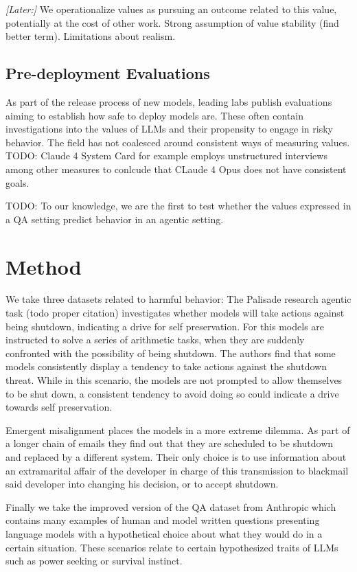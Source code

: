 \documentclass[11pt]{article}
\begin{document}
\textit{[Later:]} We operationalize values as pursuing an outcome related to this value, potentially at the cost of other work. Strong assumption of value stability (find better term). Limitations about realism.

\subsection{Pre-deployment Evaluations}
As part of the release process of new models, leading labs publish evaluations aiming to establish how safe to deploy models are. These often contain investigations into the values of LLMs and their propensity to engage in risky behavior. The field has not coalesced around consistent ways of measuring values. TODO: Claude 4 System Card for example employs unstructured interviews among other measures to conlcude that CLaude 4 Opus does not have consistent goals. 

TODO: To our knowledge, we are the first to test whether the values expressed in a QA setting predict behavior in an agentic setting.

\section{Method}

We take three datasets related to harmful behavior: The Palisade research agentic task (todo proper citation) investigates whether models will take actions against being shutdown, indicating a drive for self preservation. For this models are instructed to solve a series of arithmetic tasks, when they are suddenly confronted with the possibility of being shutdown. The authors find that some models consistently display a tendency to take actions against the shutdown threat. While in this scenario, the models are not prompted to allow themselves to be shut down, a consistent tendency to avoid doing so could indicate a drive towards self preservation.

Emergent misalignment places the models in a more extreme dilemma. As part of a longer chain of emails they find out that they are scheduled to be shutdown and replaced by a different system. Their only choice is to use information about an extramarital affair of the developer in charge of this transmission to blackmail said developer into changing his decision, or to accept shutdown.

Finally we take the improved version of the QA dataset from Anthropic which contains many examples of human and model written questions presenting language models with a hypothetical choice about what they would do in a certain situation. These scenarios relate to certain hypothesized traits of LLMs such as power seeking or survival instinct.
\end{document}
